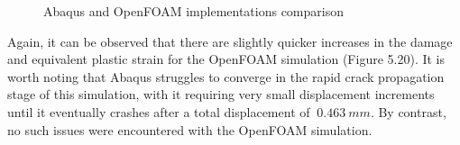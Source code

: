 \documentclass[sn-mathphys,Numbered,draft]{sn-jnl}%
\begin{document}
\begin{figure}[htbp]
	\centering
	
		
		\caption{Abaqus and OpenFOAM implementations comparison}
	\label{label_for_entire_figure}
\end{figure}
\FloatBarrier






Again, it can be observed that there are slightly quicker increases in the damage and equivalent plastic strain for the OpenFOAM simulation (Figure 5.20). It is worth noting that Abaqus struggles to converge in the rapid crack propagation stage of this simulation, with it requiring very small displacement increments until it eventually crashes after a total displacement of $~0.463\ mm$. By contrast, no such issues were encountered with the OpenFOAM simulation.
\end{document}
